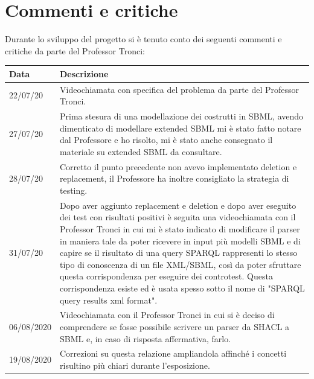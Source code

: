 \documentclass{article}
\begin{document}
\section{Commenti e critiche}
Durante lo sviluppo del progetto si è tenuto conto dei seguenti commenti e critiche da parte del Professor Tronci:

\begin{longtable}{p{2cm}p{9cm}}
    \textbf{Data} & \textbf{Descrizione} \\
    \hline
    22/07/20 & Videochiamata con specifica del problema da parte del Professor Tronci. \\
    \hline
    27/07/20 & Prima stesura di una modellazione dei costrutti in SBML, avendo dimenticato di modellare extended SBML mi è stato fatto notare dal Professore e ho risolto, mi è stato anche consegnato il materiale su extended SBML da consultare. \\
    \hline
    28/07/20 & Corretto il punto precedente non avevo implementato deletion e replacement, il Professore ha inoltre consigliato la strategia di testing. \\
    \hline
    31/07/20 & Dopo aver aggiunto replacement e deletion e dopo aver eseguito dei test con risultati positivi è seguita una videochiamata con il Professor Tronci in cui mi è stato indicato di modificare il parser in maniera tale da poter ricevere in input più modelli SBML e di capire se il risultato di una query SPARQL rappresenti lo stesso tipo di conoscenza di un file XML/SBML, così da poter sfruttare questa corrispondenza per eseguire dei controtest. Questa corrispondenza esiste ed è usata spesso sotto il nome di "SPARQL query results xml format". \\
    \hline
    06/08/2020 & Videochiamata con il Professor Tronci in cui si è deciso di comprendere se fosse possibile scrivere un parser da SHACL a SBML e, in caso di risposta affermativa, farlo. \\
    \hline
    19/08/2020 & Correzioni su questa relazione ampliandola affinché i concetti risultino più chiari durante l'esposizione. \\
    \hline
\end{longtable}

\clearpage
\end{document}
